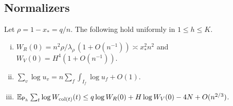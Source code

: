 \subsection{Normalizers}

\begin{lema}\label{lem:normalizadores} Let $\rho=1-x_*=q/n$. The following hold uniformly in $1\le h\le K$.
\begin{enumerate}[(i)]
\item $W_R(0)=n^2\rho/\lambda_\rho\,(1+O(n^{-1}))\asymp x_*^2n^2$ and $W_V(0)=H^4(1+O(n^{-1}))$. \item
$\sum_v\log
u_v=n\sum_f\int_{I_f}\log u_f+O(1)$. \item $\mathbb{E}_{\mathsf{P}_h}\sum_t\log W_{\mathrm{col}(t)}(t)\le q\log W_R(0)+H\log
W_V(0)-4N+O(n^{2/3})$.
\end{enumerate} \end{lema}

